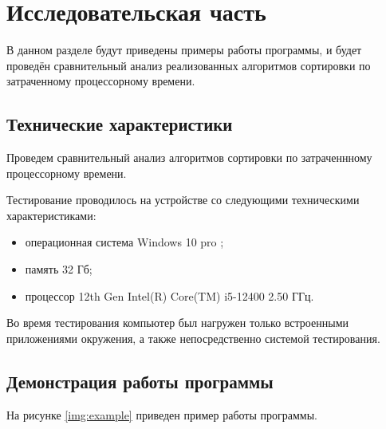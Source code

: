 \chapter{Исследовательская часть}

В данном разделе будут приведены примеры работы программы, и будет проведён сравнительный анализ реализованных алгоритмов сортировки по затраченному процессорному времени.


\section{Технические характеристики}

Проведем сравнительный анализ алгоритмов сортировки по затраченнному процессорному времени.

Тестирование проводилось на устройстве со следующими техническими характеристиками:

\begin{itemize}
	\item операционная система Windows 10 pro ;
	\item память 32 Гб;
	\item процессор 12th Gen Intel(R) Core(TM) i5-12400 2.50 ГГц.
\end{itemize}

Во время тестирования компьютер был нагружен только встроенными приложениями окружения, а также непосредственно системой тестирования.

\clearpage

\section{Демонстрация работы программы}

На рисунке \ref{img:example} приведен пример работы программы.

